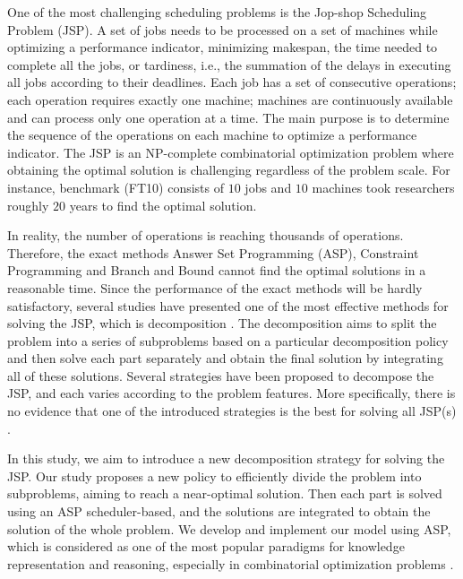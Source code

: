 \documentclass{tlp} %
\begin{document}
One of the most challenging scheduling problems is the Jop-shop Scheduling Problem (JSP). A set of jobs needs to be processed on a set of machines while optimizing a performance indicator, minimizing makespan, the time needed to complete all the jobs, or tardiness, i.e., the summation of the delays in executing all jobs according to their deadlines. Each job has a set of consecutive operations; each operation requires exactly one machine; machines are continuously available and can process only one operation at a time. The main purpose is to determine the sequence of the operations on each machine to optimize a performance indicator. The JSP is an NP-complete combinatorial optimization problem where obtaining the optimal solution is challenging regardless of the problem scale\cite{garey1976complexity,lenstra1977complexity,liu2008prediction}. For instance, benchmark (FT10) consists of $10$ jobs and $10$ machines took researchers roughly $20$ years to find the optimal solution\cite{adams1988shifting,zhang2010hybrid}.

In reality, the number of operations is reaching thousands of operations. Therefore, the exact methods Answer Set Programming (ASP), Constraint Programming and Branch and Bound cannot find the optimal solutions in a reasonable time\cite{daneshamooz2021mathematical,shi2021solving,francescutto2021solving}. Since the performance of the exact methods will be hardly satisfactory, several studies have presented one of the most effective methods for solving the JSP, which is decomposition \cite{zhang2010hybrid}. The decomposition aims to split the problem into a series of subproblems based on a particular decomposition policy and then solve each part separately and obtain the final solution by integrating all of these solutions. Several strategies have been proposed to decompose the JSP, and each varies according to the problem features. More specifically, there is no evidence that one of the introduced strategies is the best for solving all JSP(s) \cite{ovacik2012decomposition}. 

In this study, we aim to introduce a new decomposition strategy for solving the JSP. Our study proposes a new policy to efficiently divide the problem into subproblems, aiming to reach a near-optimal solution. Then each part is solved using an ASP scheduler-based, and the solutions are integrated to obtain the solution of the whole problem. We develop and implement our model using ASP, which is considered as one of the most popular paradigms for knowledge representation and reasoning, especially in combinatorial optimization problems \cite{abseher2016shift}. 
\end{document}
